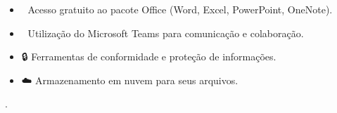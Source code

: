 \documentclass[
  a4paper,
]{book}
\providecommand{\tightlist}{%
  \setlength{\itemsep}{0pt}\setlength{\parskip}{0pt}}\usepackage{longtable,booktabs,array}
\newcommand{\emojitext}[1]{{\emoji #1}}
\begin{document}
\begin{enumerate}
\begin{itemize}
{\begin{enumerate}
        \begin{itemize}
        \tightlist
        \item
          \emojitext{📄} Acesso gratuito ao pacote Office (Word, Excel,
          PowerPoint, OneNote).
        \item
          \emojitext{💬} Utilização do Microsoft Teams para comunicação
          e colaboração.
        \item
          \emojitext{🔒} Ferramentas de conformidade e proteção de
          informações.
        \item
          \emojitext{☁️} Armazenamento em nuvem para seus arquivos.
        \end{itemize}
      \end{enumerate}}.
  \end{itemize}
\end{enumerate}
\end{document}
